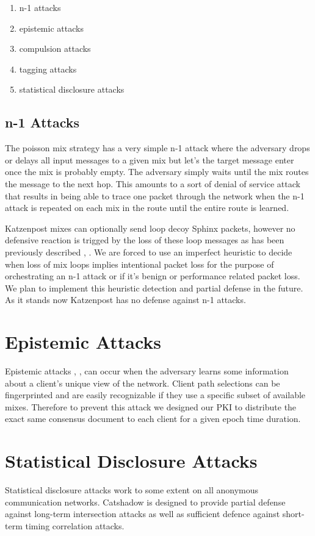 \documentclass[conference]{IEEEtran}
\begin{document}
\begin{enumerate}
  \item n-1 attacks \cite{trickle02}
  \item epistemic attacks
  \item compulsion attacks \cite{ih05-danezisclulow}
  \item tagging attacks
  \item statistical disclosure attacks
\end{enumerate}


\subsection{n-1 Attacks}
The poisson mix strategy has a very simple n-1 attack where the
adversary drops or delays all input messages to a given mix but let's
the target message enter once the mix is probably empty. The adversary
simply waits until the mix routes the message to the next hop. This
amounts to a sort of denial of service attack that results in being
able to trace one packet through the network when the n-1 attack is
repeated on each mix in the route until the entire route is learned.

Katzenpost mixes can optionally send loop decoy Sphinx packets,
however no defensive reaction is trigged by the loss of these loop
messages as has been previously described \cite{piotrowska2017loopix},
\cite{danezis:wpes2003}. We are forced to use an imperfect heuristic
to decide when loss of mix loops implies intentional packet loss for
the purpose of orchestrating an n-1 attack or if it's benign or
performance related packet loss. We plan to implement this heuristic
detection and partial defense in the future. As it stands now
Katzenpost has no defense against n-1 attacks.

\section{Epistemic Attacks}
Epistemic attacks \cite{DanezisC06}, \cite{esorics05-Klonowski},
\cite{danezis-pet2008} can occur when the adversary learns some
information about a client's unique view of the network. Client path
selections can be fingerprinted and are easily recognizable if they
use a specific subset of available mixes. Therefore to prevent this
attack we designed our PKI \cite{KatzMixPKI} to distribute the exact
same consensus document to each client for a given epoch time
duration.

\section{Statistical Disclosure Attacks}
Statistical disclosure attacks work to some extent on all anonymous
communication networks. Catshadow is designed to provide partial
defense against long-term intersection attacks as well as sufficient
defence against short-term timing correlation attacks.
\end{document}
